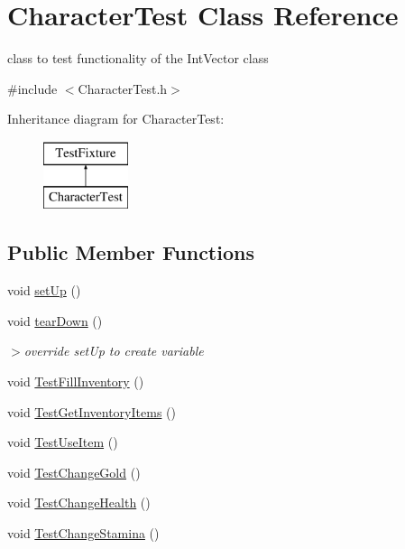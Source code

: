 \hypertarget{classCharacterTest}{\section{Character\-Test Class Reference}
\label{classCharacterTest}
}


class to test functionality of the Int\-Vector class  




{\ttfamily \#include $<$Character\-Test.\-h$>$}

Inheritance diagram for Character\-Test\-:\begin{figure}[H]
\begin{center}
\leavevmode
\includegraphics[height=2.000000cm]{classCharacterTest}
\end{center}
\end{figure}
\subsection*{Public Member Functions}
\begin{DoxyCompactItemize}
\item 
void \hyperlink{classCharacterTest_ace997a849bc464da6408580b20abbde5}{set\-Up} ()
\item 
void \hyperlink{classCharacterTest_a05593bb1528dc441abbfe3704110d8d8}{tear\-Down} ()
\begin{DoxyCompactList}\small\item\em $>$override {\ttfamily set\-Up} to create variable \end{DoxyCompactList}\item 
void \hyperlink{classCharacterTest_a348e663ab1846bbe64770dfd437bea49}{Test\-Fill\-Inventory} ()
\item 
void \hyperlink{classCharacterTest_a0fae073fe364d5bb09e1488505f2f247}{Test\-Get\-Inventory\-Items} ()
\item 
void \hyperlink{classCharacterTest_a6510093a5bfccb8d325e00e0a15a81c2}{Test\-Use\-Item} ()
\item 
void \hyperlink{classCharacterTest_a318991be56057b2587fcf357e13409ab}{Test\-Change\-Gold} ()
\item 
void \hyperlink{classCharacterTest_a1e3ff758e3a47589ac31297cf62db9c4}{Test\-Change\-Health} ()
\item 
void \hyperlink{classCharacterTest_ac61fb4a8c3c9b4a3f1d8e70856d4c9e0}{Test\-Change\-Stamina} ()
\end{DoxyCompactItemize}
